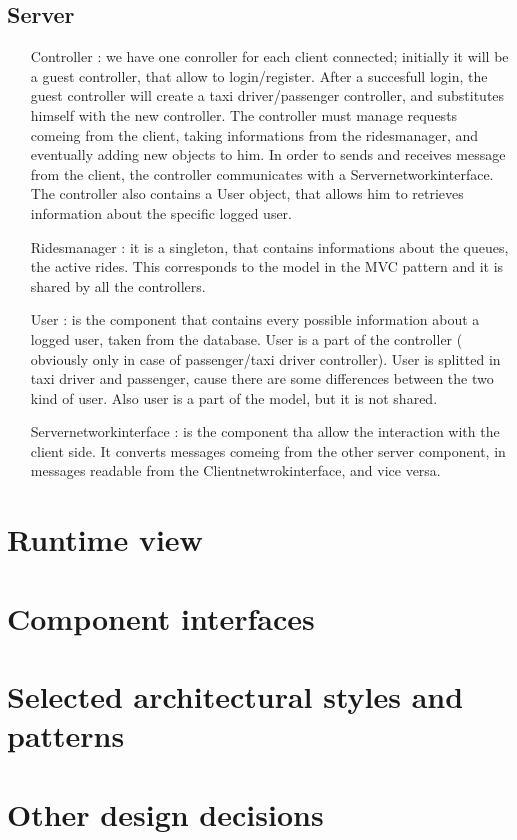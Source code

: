 	\subsection{Server}
	\begin{itemize}
	 \item [Controller]: we have one conroller for each client connected; initially it will be a guest controller,
	 that allow to login/register. After a succesfull login, the guest controller will create a taxi driver/passenger controller,
	 and substitutes himself with the new controller. The controller must manage requests comeing from
	 the client, taking informations from the ridesmanager, and eventually adding new objects to him.
	 In order to sends and receives message from the client, the controller communicates with a Servernetworkinterface.
	 The controller also contains a User object, that allows him to retrieves information about the specific logged user.
	 \item [Ridesmanager]: it is a singleton, that contains informations about the queues, the active rides. This corresponds 
	 to the model in the MVC pattern and it is shared by all the controllers.
	 \item [User]: is the component that contains every possible information about a logged user, taken from the database.
	 User is a part of the controller ( obviously only in case of passenger/taxi driver controller).
	 User is splitted in taxi driver and passenger, cause there are some differences between the two kind of user.
	 Also user is a part of the model, but it is not shared.
	 \item[Servernetworkinterface]: is the component tha allow the interaction with the client side. It converts messages comeing from
	 the other server component, in messages readable from the Clientnetwrokinterface, and vice versa.
	\end{itemize}
\section{Runtime view}

\section{Component interfaces}

\section{Selected architectural styles and patterns}

\section{Other design decisions}
